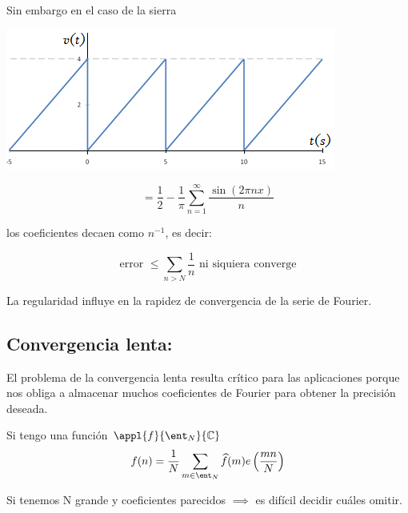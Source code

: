 Sin embargo en el caso de la sierra

\begin{minipage}{0.5\textwidth}
\begin{center}
\includegraphics[width=\textwidth]{img/sierra.png}
\end{center}
\end{minipage}
\begin{minipage}{0.5\textwidth}
\[ = \frac{1}{2} - \frac{1}{\pi} \sum^{\infty}_{n = 1} \frac{\sin(2 \pi n x)}{n}\]
\end{minipage}


los coeficientes decaen como $n^{-1}$, es decir:

\[ \text{error } \leq\sum_{n > N} \frac{1}{n} \text{ ni siquiera converge}\]

\obs La regularidad influye en la rapidez de convergencia de la serie de Fourier.




\subsection{Convergencia lenta:}
El problema de la convergencia lenta resulta crítico para las aplicaciones porque nos obliga a almacenar muchos coeficientes de Fourier para obtener la precisión deseada.

\begin{example}
	Si tengo una función $\appl{f}{\ent_N}{\mathbb{C}}$
	$$f(n) = \frac{1}{N}\sum_{m \in \ent_N}\widehat{f}(m)e\left(\frac{mn}{N}\right)$$

	Si tenemos N grande y coeficientes parecidos $\implies$ es difícil decidir cuáles omitir.
\end{example}

